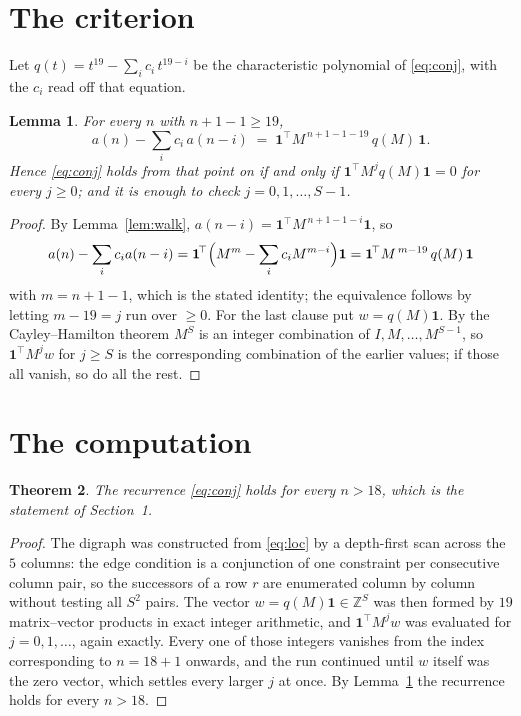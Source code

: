 \documentclass[11pt,a4paper]{article}
\theoremstyle{plain}
\newtheorem{theorem}{Theorem}
\newtheorem{lemma}[theorem]{Lemma}
\theoremstyle{definition}
\begin{document}
\section{The criterion}

Let $q(t)=t^{19}-\sum_i c_i\,t^{19-i}$ be the characteristic polynomial of
\eqref{eq:conj}, with the $c_i$ read off that equation.

\begin{lemma}\label{lem:crit}
For every $n$ with $n+1-1\ge19$,
\[
a(n)-\sum_i c_i\,a(n-i)\;=\;\mathbf{1}^{\!\top}M^{\,n+1-1-19}\,q(M)\,\mathbf{1} .
\]
Hence \eqref{eq:conj} holds from that point on if and only if
$\mathbf{1}^{\!\top}M^{j}q(M)\mathbf{1}=0$ for every $j\ge0$; and it is enough to check
$j=0,1,\dots,S-1$.
\end{lemma}

\begin{proof}
By Lemma~\ref{lem:walk}, $a(n-i)=\mathbf{1}^{\!\top}M^{\,n+1-1-i}\mathbf{1}$, so
\[
a(n)-\sum_i c_i a(n-i)
=\mathbf{1}^{\!\top}\Bigl(M^{m}-\sum_i c_i M^{m-i}\Bigr)\mathbf{1}
=\mathbf{1}^{\!\top}M^{\,m-19}\,q(M)\,\mathbf{1}
\]
with $m=n+1-1$, which is the stated identity; the equivalence follows by letting
$m-19=j$ run over $\ge0$. For the last clause put $w=q(M)\mathbf{1}$. By the
Cayley--Hamilton theorem $M^{S}$ is an integer combination of $I,M,\dots,M^{S-1}$, so
$\mathbf{1}^{\!\top}M^{j}w$ for $j\ge S$ is the corresponding combination of the earlier
values; if those all vanish, so do all the rest.
\end{proof}

\section{The computation}

\begin{theorem}
The recurrence \eqref{eq:conj} holds for every $n>18$, which is the statement of
Section~1.
\end{theorem}

\begin{proof}
The digraph was constructed from \eqref{eq:loc} by a depth-first scan across the $5$
columns: the edge condition is a conjunction of one constraint per consecutive column
pair, so the successors of a row $r$ are enumerated column by column without testing all
$S^2$ pairs. The vector $w=q(M)\mathbf{1}\in\mathbb{Z}^{S}$ was then formed by $19$
matrix--vector products in exact integer arithmetic, and $\mathbf{1}^{\!\top}M^{j}w$ was
evaluated for $j=0,1,\dots$, again exactly. Every one of those integers vanishes from the
index corresponding to $n=18+1$ onwards, and the run continued until $w$ itself was the
zero vector, which settles every larger $j$ at once. By Lemma~\ref{lem:crit} the recurrence
holds for every $n>18$.
\end{proof}
\end{document}
